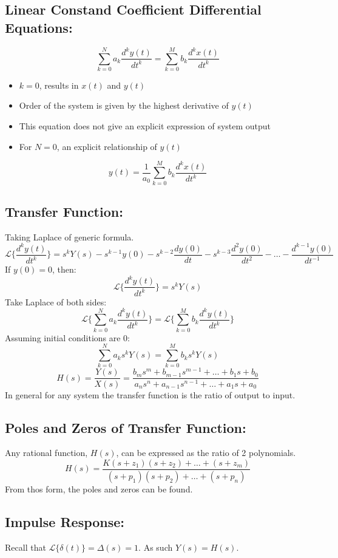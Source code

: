 \documentclass[a5paper]{article}
\newcommand{\Lap}{\mathcal{L}}
\begin{document}
	\subsection{Linear Constand Coefficient Differential Equations:}
	$$\sum^{N}_{k=0}a_{k}\frac{d^{k}y(t)}{dt^{k}}=\sum^{M}_{k=0}b_{k}\frac{d^{k}x(t)}{dt^{k}}$$
	\begin{itemize}
		\item $k=0$, results in $x(t)$ and $y(t)$
		\item Order of the system is given by the highest derivative of $y(t)$
		\item This equation does not give an explicit expression of system output
		\item For $N=0$, an explicit relationship of $y(t)$
	\end{itemize}
	$$y(t)=\frac{1}{a_{0}}\sum^{M}_{k=0}b_{k}\frac{d^{k}x(t)}{dt^{k}}$$
	\subsection{Transfer Function:}
	Taking Laplace of generic formula.
	$$\Lap\{\frac{d^{k}y(t)}{dt^{k}}\}=s^{k}Y(s)-s^{k-1}y(0)-s^{k-2}\frac{dy(0)}{dt}-s^{k-3}\frac{d^{2}y(0)}{dt^{2}}-\ldots-\frac{d^{k-1}y(0)}{dt^{-1}}$$
	If $y(0)=0$, then:
	$$\Lap\{\frac{d^{k}y(t)}{dt^{k}}\}=s^{k}Y(s)$$
	Take Laplace of both sides:
	$$\Lap\{\sum^{N}_{k=0}a_{k}\frac{d^{k}y(t)}{dt^{k}}\}=\Lap\{\sum^{M}_{k=0}b_{k}\frac{d^{k}y(t)}{dt^{k}}\}$$
	Assuming initial conditions are 0:
	$$\sum^{N}_{k=0}a_{k}s^{k}Y(s)=\sum^{M}_{k=0}b_{k}s^{k}Y(s)$$
	$$H(s)=\frac{Y(s)}{X(s)}=\frac{b_{m}s^{m}+b_{m-1}s^{m-1}+\ldots+b_{1}s+b_{0}}{a_{n}s^{n}+a_{n-1}s^{n-1}+\ldots+a_{1}s+a_{0}}$$
	In general for any system the transfer function is the ratio of output to input.
	\subsection{Poles and Zeros of Transfer Function:}
	Any rational function, $H(s)$, can be expressed as the ratio of 2 polynomials.
	$$H(s)=\frac{K(s+z_{1})(s+z_{2})+\ldots+(s+z_{m})}{(s+p_{1})(s+p_{2})+\ldots+(s+p_{n})}$$
	From thos form, the poles and zeros can be found.
	\subsection{Impulse Response:}
	Recall that $\Lap\{\delta(t)\}=\Delta(s)=1$. As such $Y(s)=H(s)$.
\end{document}
